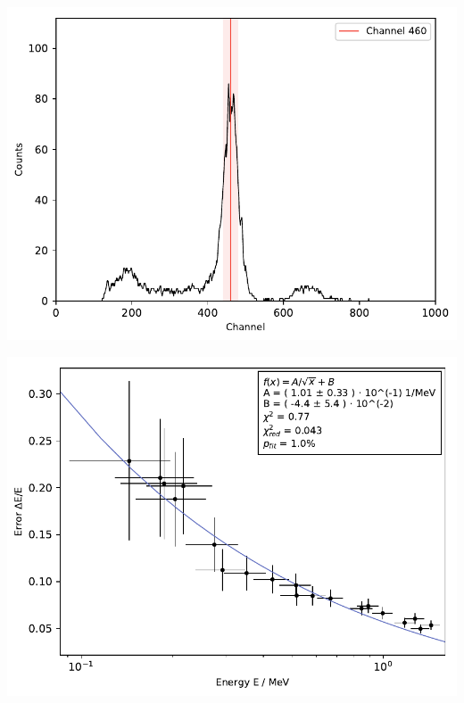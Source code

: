 \begin{multicols}{2}
\begin{center}
\begin{adjustbox}{max width=\linewidth, keepaspectratio}
        \end{adjustbox}
        \captionsetup{width=0.75\linewidth}
        \label{fig:137Cskoinz1}
    \end{center}
\endminipage
%
\par
%
\minipage{\linewidth}
    \begin{center}
        \captionsetup{type=figure}
        \begin{adjustbox}{max width=\linewidth, keepaspectratio}
            \includegraphics[]{pdf/comptonpeak}
        \end{adjustbox}
        \captionsetup{width=0.75\linewidth}
        \label{fig:comptonpeak}
    \end{center}
\endminipage
%
\par
%
\minipage{\linewidth}
    \begin{center}
        \captionsetup{type=figure}
        \begin{adjustbox}{max width=\linewidth, keepaspectratio}
            \includegraphics[]{pdf/energy_resolution}

\end{adjustbox}
\end{center}
\end{multicols}
